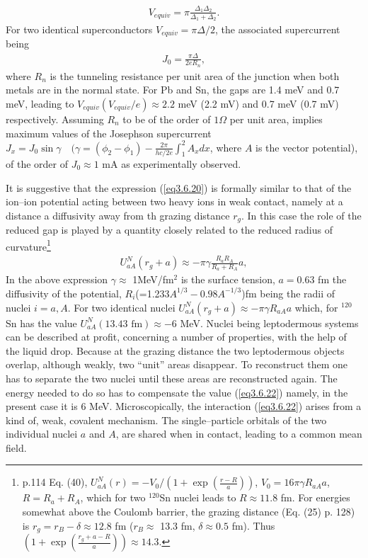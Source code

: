 \begin{align}\label{eq3.6.20}
V_{equiv}=\pi\frac{\Delta_1\Delta_2}{\Delta_1+\Delta_2}.
\end{align}
For two identical superconductors $V_{equiv}=\pi\Delta/2$, the associated supercurrent being
\begin{align}
J_0=\frac{\pi\Delta}{2eR_n},
\end{align}
 where $R_n$ is the tunneling resistance per unit area of the junction when both metals are in the normal state. For Pb and Sn, the gaps are 1.4 meV and 0.7 meV, leading to $V_{equiv} (V_{equiv}/e)\approx 2.2$ meV (2.2 mV) and 0.7 meV (0.7 mV) respectively. Assuming $R_n$ to be of the order of $1\Omega$ per unit area, implies maximum values of the Josephson supercurrent $J_x=J_0\sin\gamma\quad(\gamma=(\phi_2-\phi_1)-\frac{2\pi}{h c/2e}\int^2_1A_x dx$, where $A$ is the vector potential), of the order of $J_0\approx 1$ mA as experimentally observed.
 
 
 It is suggestive that the expression (\ref{eq3.6.20}) is formally similar to that of the ion--ion potential acting between two heavy ions in weak contact, namely at a distance  a diffusivity away from th grazing distance $r_g$. In this case the role of the reduced gap is played by a quantity closely related to the reduced radius of curvature\footnote{\cite{Broglia:04a} p.114  Eq. (40), $U_{aA}^{N}(r)=-V_0/(1+\exp(\frac{r-R}{a}))$, $V_0=16\pi\gamma R_{aA}a$, $R=R_a+R_A$, which for two $^{120}$Sn nuclei leads to $R\approx11.8$ fm. For energies somewhat above the Coulomb barrier, the grazing distance (Eq. (25) p. 128) is $r_g=r_B-\delta\approx12.8$ fm ($r_B\approx$ 13.3 fm, $\delta\approx0.5$ fm). Thus $(1+\exp(\frac{r_g+a-R}{a}))\approx14.3$.}
 \begin{align}\label{eq3.6.22}
 U_{aA}^N(r_g+a)\approx-\pi\gamma\frac{R_aR_A}{R_a+R_A}a,
 \end{align}
 In the above expression $\gamma\approx$ 1MeV/fm$^2$ is the surface tension, $a=0.63$ fm the diffusivity of the potential, $R_i$(=1.233$A^{1/3}-0.98A^{-1/3}$)fm being the radii of nuclei $i=a,A$. For two identical nuclei $U_{aA}^N(r_g+a)\approx-\pi\gamma R_{aA}a$ which, for $^{120}$Sn has the value $U_{aA}^N(13.43 \text{ fm})\approx-6$ MeV. Nuclei being leptodermous systems can be described at profit, concerning a number of properties, with the help of the liquid drop. Because at the grazing distance the two leptodermous objects overlap, although weakly, two ``unit'' areas disappear. To reconstruct them one has to separate the two nuclei until these areas are reconstructed again. The energy needed to do so has to compensate the value (\ref{eq3.6.22}) namely, in the present case it is 6 MeV. Microscopically, the interaction (\ref{eq3.6.22}) arises from a kind of, weak, covalent mechanism. The single--particle orbitals of the two individual nuclei $a$ and $A$, are shared when in contact, leading to a common mean field.
 
